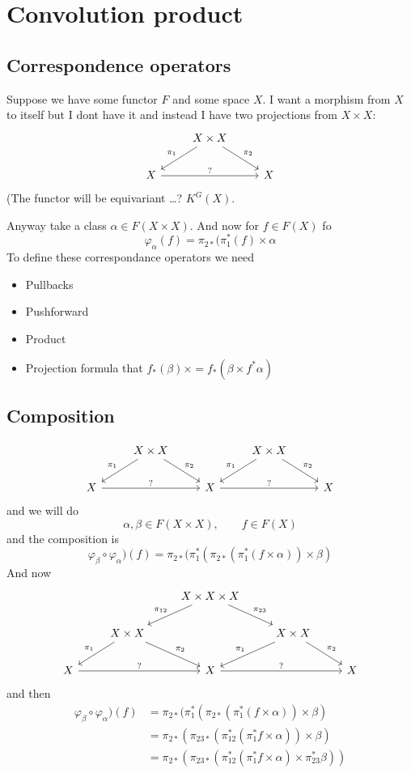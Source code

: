 \tableofcontents

\section{Convolution product}

\subsection{Correspondence operators}

Suppose we have some functor $F$ and some space  $X$. I want a morphism from $X$ to itself but I dont have it and instead I have two projections from $X \times  X$:
\[\begin{tikzcd}
&X\times X\arrow[dl,"\pi_1",swap]\arrow[dr,"\pi_2"]\\
X\arrow[rr,"?"]&&X
\end{tikzcd}\]
(The functor will be equivariant …? $K^G(X)$.

Anyway take a class $\alpha \in F(X\times X)$. And now for $f\in F(X)$ fo
\[\varphi_\alpha(f)=\pi_{2*}(\pi_1^*(f)\times \alpha\]
To define these correspondance operators we need
\begin{itemize}
\item Pullbacks
	\item Pushforward
		\item Product
			\item Projection formula that $f_*(\beta)\times =f_*(\beta\times f^*\alpha)$
\end{itemize}

\subsection{Composition}

\[\begin{tikzcd}
&X\times X\arrow[dl,"\pi_1",swap]\arrow[dr,"\pi_2"]&&X\times X\arrow[dl,"\pi_1",swap]\arrow[dr,"\pi_2"]\\
X\arrow[rr,"?"]&&X\arrow[rr,"?"]&&X
\end{tikzcd}\]
and we will do
\[\alpha,\beta \in F(X\times X),\qquad  f\in F(X)\]
 and the composition is
 \[\varphi_\beta\circ \varphi_\alpha)(f)=\pi_{2*}(\pi_1^* (\pi_{2*}(\pi_1^*(f\times \alpha))\times \beta)\]
And now
\[\begin{tikzcd}
	&  & X \times  X \times  X\arrow[dl,"\pi_{12}",swap]\arrow[dr,"\pi_{23}"]\\
&X\times X\arrow[dl,"\pi_1",swap]\arrow[dr,"\pi_2"]&&X\times X\arrow[dl,"\pi_1",swap]\arrow[dr,"\pi_2"]\\
X\arrow[rr,"?"]&&X\arrow[rr,"?"]&&X
\end{tikzcd}\]
and then
 \begin{align*}\varphi_\beta\circ \varphi_\alpha)(f)&=\pi_{2*}(\pi_1^* (\pi_{2*}(\pi_1^*(f\times \alpha))\times \beta)\\
	 &=\pi_{2*}(\pi_{23*}(\pi_{12}^*(\pi_1^*f\times \alpha))\times \beta)\\
	 &=\pi_{2*}(\pi_{23*}(\pi^*_{12}(\pi_1^*f\times \alpha)\times \pi_{23}^*\beta))
	 \end{align*}

